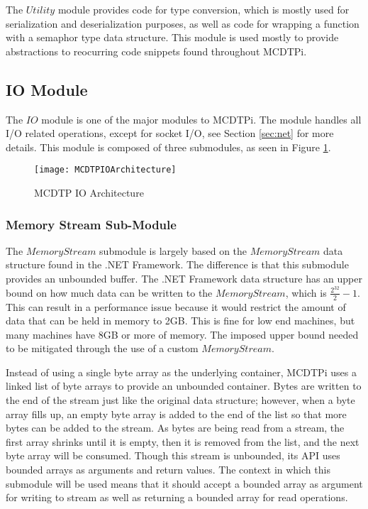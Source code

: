 The $Utility$ module provides code for type conversion, which is mostly used for serialization and deserialization purposes, as well as code for wrapping a function with a semaphor type data structure. This module is used mostly to provide abstractions to reocurring code snippets found throughout MCDTPi.

\subsection{IO Module}

The $IO$ module is one of the major modules to MCDTPi. The module handles all I/O related operations, except for socket I/O, see Section \ref{sec:net} for more details. This module is composed of three submodules, as seen in Figure \ref{fig:mcdtp-io-arch}.

\begin{figure}[ht]
\centering
\texttt{[image: MCDTPIOArchitecture]}
\caption{MCDTP IO Architecture}
\label{fig:mcdtp-io-arch}
\end{figure}

\subsubsection{Memory Stream Sub-Module}

The $MemoryStream$ submodule is largely based on the $MemoryStream$ data structure found in the .NET Framework. The difference is that this submodule provides an unbounded buffer. The .NET Framework data structure has an upper bound on how much data can be written to the $MemoryStream$, which is $\frac{2^{32}}{2} - 1$. This can result in a performance issue because it would restrict the amount of data that can be held in memory to 2GB. This is fine for low end machines, but many machines have 8GB or more of memory. The imposed upper bound needed to be mitigated through the use of a custom $MemoryStream$.

Instead of using a single byte array as the underlying container, MCDTPi uses a linked list of byte arrays to provide an unbounded container. Bytes are written to the end of the stream just like the original data structure; however, when a byte array fills up, an empty byte array is added to the end of the list so that more bytes can be added to the stream. As bytes are being read from a stream, the first array shrinks until it is empty, then it is removed from the list, and the next byte array will be consumed. Though this stream is unbounded, its API uses bounded arrays as arguments and return values. The context in which this submodule will be used means that it should accept a bounded array as argument for writing to stream as well as returning a bounded array for read operations.

